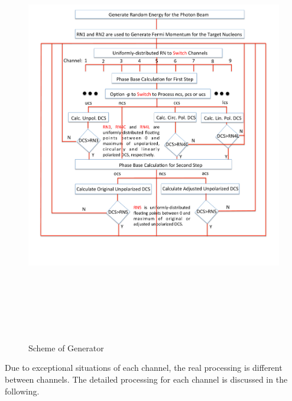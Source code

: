 \documentclass[a4paper]{article}
\begin{document}
\begin{figure}[H]
   \begin{center}
   \includegraphics[width=6.8in,height=7.2in]{flow-chart.pdf} 
   \caption[]{Scheme of Generator}      \label{scheme}
   \end{center}
\end{figure}

Due to exceptional situations of each channel, the real processing is different between channels. The detailed processing for each channel is discussed in the following.
\end{document}
